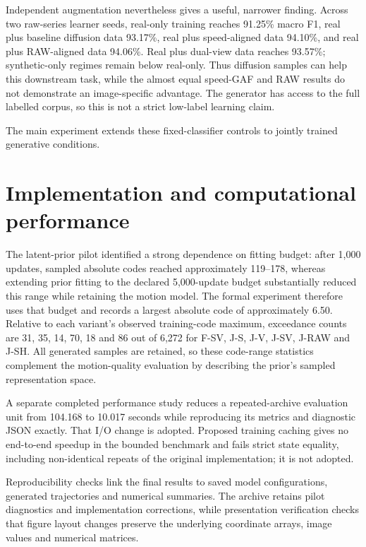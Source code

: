 Independent augmentation nevertheless gives a useful, narrower finding. Across two raw-series learner seeds, real-only training reaches 91.25\% macro F1, real plus baseline diffusion data 93.17\%, real plus speed-aligned data 94.10\%, and real plus RAW-aligned data 94.06\%. Real plus dual-view data reaches 93.57\%; synthetic-only regimes remain below real-only. Thus diffusion samples can help this downstream task, while the almost equal speed-GAF and RAW results do not demonstrate an image-specific advantage. The generator has access to the full labelled corpus, so this is not a strict low-label learning claim.


The main experiment extends these fixed-classifier controls to jointly trained generative conditions.

\section{Implementation and computational performance}
The latent-prior pilot identified a strong dependence on fitting budget: after 1,000 updates, sampled absolute codes reached approximately 119--178, whereas extending prior fitting to the declared 5,000-update budget substantially reduced this range while retaining the motion model. The formal experiment therefore uses that budget and records a largest absolute code of approximately 6.50. Relative to each variant's observed training-code maximum, exceedance counts are 31, 35, 14, 70, 18 and 86 out of 6,272 for F-SV, J-S, J-V, J-SV, J-RAW and J-SH. All generated samples are retained, so these code-range statistics complement the motion-quality evaluation by describing the prior's sampled representation space.

A separate completed performance study reduces a repeated-archive evaluation unit from 104.168 to 10.017 seconds while reproducing its metrics and diagnostic JSON exactly. That I/O change is adopted. Proposed training caching gives no end-to-end speedup in the bounded benchmark and fails strict state equality, including non-identical repeats of the original implementation; it is not adopted.

Reproducibility checks link the final results to saved model configurations, generated trajectories and numerical summaries. The archive retains pilot diagnostics and implementation corrections, while presentation verification checks that figure layout changes preserve the underlying coordinate arrays, image values and numerical matrices.

